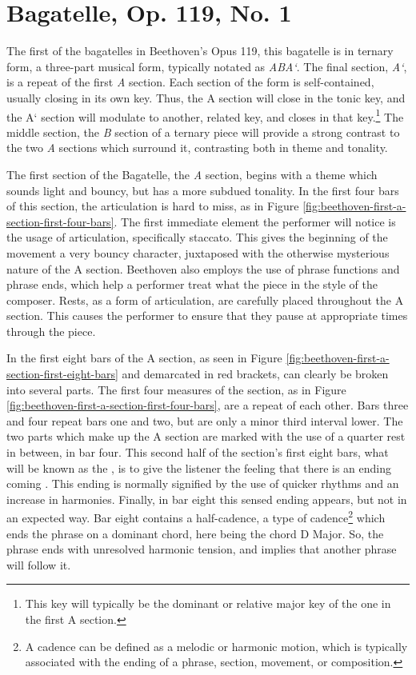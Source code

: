 \section{Bagatelle, Op. 119, No. 1}
The first of the bagatelles in Beethoven's Opus 119, this bagatelle is in ternary form, a three-part musical form, typically notated as \textit{ABA`}. The final section, \textit{A`}, is a repeat of the first \textit{A} section. Each section of the form is self-contained, usually closing in its own key\autocite{Tucker_Cochrane_2011}. Thus, the A section will close in the tonic key, and the A` section will modulate to another, related key, and closes in that key.\footnote{This key will typically be the dominant or relative major key of the one in the first A section.} The middle section, the \textit{B} section of a ternary piece will provide a strong contrast to the two \textit{A} sections which surround it, contrasting both in theme and tonality.

The first section of the Bagatelle, the \textit{A} section, begins with a theme which sounds light and bouncy, but has a more subdued tonality. In the first four bars of this section, the articulation is hard to miss, as in Figure \ref{fig:beethoven-first-a-section-first-four-bars}. The first immediate element the performer will notice is the usage of articulation, specifically staccato. This gives the beginning of the movement a very bouncy character, juxtaposed with the otherwise mysterious nature of the A section. Beethoven also employs the use of phrase functions and phrase ends, which help a performer treat what the piece  in the style of the composer. Rests, as a form of articulation, are carefully placed throughout the A section. This causes the performer to ensure that they pause at appropriate times through the piece. 

In the first eight bars of the A section, as seen in Figure \ref{fig:beethoven-first-a-section-first-eight-bars}\autocite{Henle_1978} and demarcated in red brackets, can clearly be broken into several parts. The first four measures of the section, as in Figure \ref{fig:beethoven-first-a-section-first-four-bars}\autocite{Henle_1978}, are a repeat of each other. Bars three and four repeat bars one and two, but are only a minor third interval lower. The two parts which make up the A section are marked with the use of a quarter rest in between, in bar four. This second half of the section's first eight bars, what will be known as the , is to give the listener the feeling that there is an ending coming \autocite{Kerman_Tyson_Burnham_Johnson_Drabkin_2001}. This ending is normally signified by the use of quicker rhythms and an increase in harmonies. Finally, in bar eight this sensed ending appears, but not in an expected way. Bar eight contains a half-cadence, a type of cadence\footnote{A cadence can be defined as a melodic or harmonic motion, which is typically associated with the ending of a phrase, section, movement, or composition.}\autocite{Nagley_Whittall_2011} which ends the phrase on a dominant chord, here being the chord D Major. So, the phrase ends with unresolved harmonic tension, and implies that another phrase will follow it.


